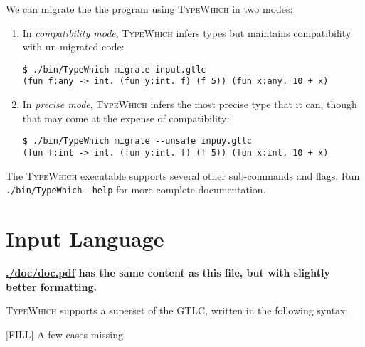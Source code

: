 \documentclass{article}
\newcommand{\system}{\textsc{TypeWhich}\xspace}
\begin{document}
We can migrate the the program using \system in two modes:

\begin{enumerate}

\item In \emph{compatibility mode}, \system infers types but maintains
compatibility with un-migrated code:

\begin{verbatim}
$ ./bin/TypeWhich migrate input.gtlc
(fun f:any -> int. (fun y:int. f) (f 5)) (fun x:any. 10 + x)
\end{verbatim}

\item In \emph{precise mode}, \system infers the most precise type that it
can, though that may come at the expense of compatibility:

\begin{verbatim}
$ ./bin/TypeWhich migrate --unsafe inpuy.gtlc
(fun f:int -> int. (fun y:int. f) (f 5)) (fun x:int. 10 + x)
\end{verbatim}
     
\end{enumerate}

The \system executable supports several other sub-commands and flags. 
Run \texttt{./bin/TypeWhich --help} for more complete documentation.

\section{Input Language}\label{input-lang-gtlc}

\textbf{\url{./doc/doc.pdf} has the same content as this file, but with
slightly better formatting.}

\system supports a superset of the GTLC, written in the following syntax:

[FILL] A few cases missing
\end{document}
